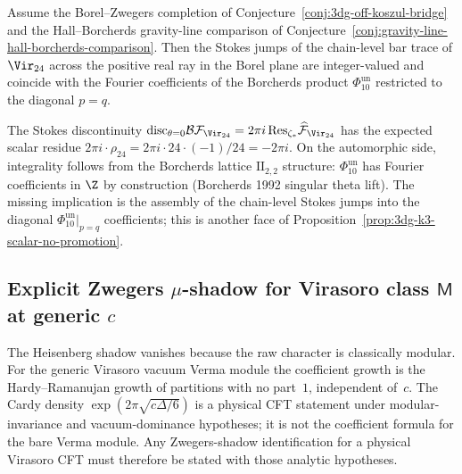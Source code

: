 \begin{conjecture}[Stokes integrality at $c = 24$]
\label{prop:3dg-stokes-integrality-c24}
%
Assume the Borel--Zwegers completion of
Conjecture~\ref{conj:3dg-off-koszul-bridge} and the
Hall--Borcherds gravity-line comparison of
Conjecture~\ref{conj:gravity-line-hall-borcherds-comparison}. Then
the Stokes jumps of the chain-level bar trace of \(\Vir_{24}\) across
the positive real ray in the Borel plane are integer-valued and
coincide with the Fourier coefficients of the Borcherds product
\(\Phi_{10}^{\mathrm{un}}\) restricted to the diagonal \(p=q\).
\end{conjecture}

\begin{remark}
The Stokes discontinuity
$\mathrm{disc}_{\theta = 0}\mathcal B\mathcal F_{\Vir_{24}}
= 2\pi i\,\mathrm{Res}_{\zeta_{\ast}}\widehat{\mathcal F}_{\Vir_{24}}$
has the expected scalar residue
\(2\pi i \cdot \rho_{24}=2\pi i\cdot24\cdot(-1)/24=-2\pi i\).
On the automorphic side, integrality follows from the Borcherds
lattice \(\mathrm{II}_{2,2}\) structure:
\(\Phi_{10}^{\mathrm{un}}\) has Fourier coefficients in $\Z$ by construction
(Borcherds 1992 singular theta lift). The missing implication is the
assembly of the chain-level Stokes jumps into the diagonal
\(\Phi_{10}^{\mathrm{un}}|_{p=q}\) coefficients; this is another face of
Proposition~\ref{prop:3dg-k3-scalar-no-promotion}.
\end{remark}

\subsection{Explicit Zwegers $\mu$-shadow for Virasoro class $\mathsf M$ at generic $c$}
\label{subsec:3dg-zwegers-virasoro}
%
%
%
%

The Heisenberg shadow vanishes because the raw character is classically
modular. For the generic Virasoro vacuum Verma module the coefficient
growth is the Hardy--Ramanujan growth of partitions with no part~$1$,
independent of~$c$. The Cardy density
\(\exp(2\pi\sqrt{c\Delta/6})\) is a physical CFT statement under
modular-invariance and vacuum-dominance hypotheses; it is not the
coefficient formula for the bare Verma module. Any Zwegers-shadow
identification for a physical Virasoro CFT must therefore be stated
with those analytic hypotheses.

